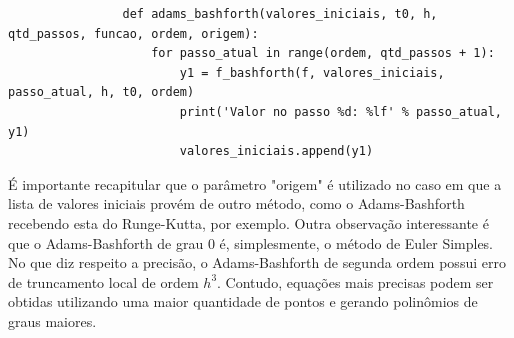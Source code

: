 \documentclass{article}
\begin{document}
\begin{otherlanguage}{brazil}
                \begin{lstlisting}
                def adams_bashforth(valores_iniciais, t0, h, qtd_passos, funcao, ordem, origem):
                    for passo_atual in range(ordem, qtd_passos + 1):
                        y1 = f_bashforth(f, valores_iniciais, passo_atual, h, t0, ordem)
                        print('Valor no passo %d: %lf' % passo_atual, y1)
                        valores_iniciais.append(y1)
                \end{lstlisting}
                É importante recapitular que o parâmetro "origem" é utilizado no caso em que a lista de valores iniciais provém de outro método, como o Adams-Bashforth recebendo esta do Runge-Kutta, por exemplo.
                Outra observação interessante é que o Adams-Bashforth de grau 0 é, simplesmente, o método de Euler Simples.
                No que diz respeito a precisão, o Adams-Bashforth de segunda ordem possui erro de truncamento local de ordem $h^3$. Contudo, equações mais precisas podem ser obtidas utilizando uma maior quantidade de pontos e gerando polinômios de graus maiores.

\end{otherlanguage}
\end{document}
